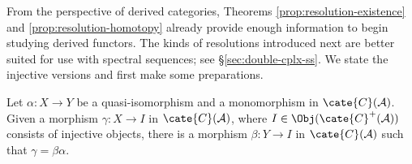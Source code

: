 From the perspective of derived categories, Theorems
\ref{prop:resolution-existence} and \ref{prop:resolution-homotopy} already
provide enough information to begin studying derived functors. The kinds of
resolutions introduced next are better suited for use with spectral sequences;
see \S\ref{sec:double-cplx-ss}. We state the injective versions and first make
some preparations.

\begin{lemma}\label{prop:ext-alpha-beta}
	Let $\alpha:X\to Y$ be a quasi-isomorphism and a monomorphism in
	$\cate{C}(\mathcal{A})$. Given a morphism $\gamma:X\to I$ in
	$\cate{C}(\mathcal{A})$, where
	$I\in\Obj(\cate{C}^+(\mathcal{A}))$ consists of injective objects, there
	is a morphism $\beta:Y\to I$ in $\cate{C}(\mathcal{A})$ such that
	$\gamma=\beta\alpha$.
\end{lemma}

